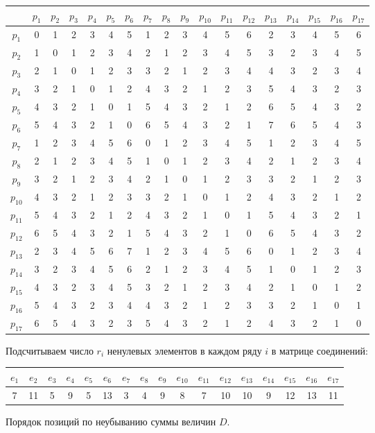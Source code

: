 \documentclass[12pt, a4paper] {ncc}
\begin{document}
\begin{tabular}{c|c|c|c|c|c|c|c|c|c|c|c|c|c|c|c|c|c}
\hline
      & $p_{1}$ & $p_{2}$ & $p_{3}$ & $p_{4}$ & $p_{5}$ & $p_{6}$ & $p_{7}$ & $p_{8}$ & $p_{9}$ & $p_{10}$ & $p_{11}$ & $p_{12}$ & $p_{13}$ & $p_{14}$ & $p_{15}$ & $p_{16}$ & $p_{17}$ \\
\hline
$p_{1}$  & 0 & 1 & 2 & 3 & 4 & 5 & 1 & 2 & 3 & 4 & 5 & 6 & 2 & 3 & 4 & 5 & 6 \\ \hline
$p_{2}$  & 1 & 0 & 1 & 2 & 3 & 4 & 2 & 1 & 2 & 3 & 4 & 5 & 3 & 2 & 3 & 4 & 5 \\ \hline
$p_{3}$  & 2 & 1 & 0 & 1 & 2 & 3 & 3 & 2 & 1 & 2 & 3 & 4 & 4 & 3 & 2 & 3 & 4 \\ \hline
$p_{4}$  & 3 & 2 & 1 & 0 & 1 & 2 & 4 & 3 & 2 & 1 & 2 & 3 & 5 & 4 & 3 & 2 & 3 \\ \hline
$p_{5}$  & 4 & 3 & 2 & 1 & 0 & 1 & 5 & 4 & 3 & 2 & 1 & 2 & 6 & 5 & 4 & 3 & 2 \\ \hline
$p_{6}$  & 5 & 4 & 3 & 2 & 1 & 0 & 6 & 5 & 4 & 3 & 2 & 1 & 7 & 6 & 5 & 4 & 3 \\ \hline
$p_{7}$  & 1 & 2 & 3 & 4 & 5 & 6 & 0 & 1 & 2 & 3 & 4 & 5 & 1 & 2 & 3 & 4 & 5 \\ \hline
$p_{8}$  & 2 & 1 & 2 & 3 & 4 & 5 & 1 & 0 & 1 & 2 & 3 & 4 & 2 & 1 & 2 & 3 & 4 \\ \hline
$p_{9}$  & 3 & 2 & 1 & 2 & 3 & 4 & 2 & 1 & 0 & 1 & 2 & 3 & 3 & 2 & 1 & 2 & 3 \\ \hline
$p_{10}$ & 4 & 3 & 2 & 1 & 2 & 3 & 3 & 2 & 1 & 0 & 1 & 2 & 4 & 3 & 2 & 1 & 2 \\ \hline
$p_{11}$ & 5 & 4 & 3 & 2 & 1 & 2 & 4 & 3 & 2 & 1 & 0 & 1 & 5 & 4 & 3 & 2 & 1 \\ \hline
$p_{12}$ & 6 & 5 & 4 & 3 & 2 & 1 & 5 & 4 & 3 & 2 & 1 & 0 & 6 & 5 & 4 & 3 & 2 \\ \hline
$p_{13}$ & 2 & 3 & 4 & 5 & 6 & 7 & 1 & 2 & 3 & 4 & 5 & 6 & 0 & 1 & 2 & 3 & 4 \\ \hline
$p_{14}$ & 3 & 2 & 3 & 4 & 5 & 6 & 2 & 1 & 2 & 3 & 4 & 5 & 1 & 0 & 1 & 2 & 3 \\ \hline
$p_{15}$ & 4 & 3 & 2 & 3 & 4 & 5 & 3 & 2 & 1 & 2 & 3 & 4 & 2 & 1 & 0 & 1 & 2 \\ \hline
$p_{16}$ & 5 & 4 & 3 & 2 & 3 & 4 & 4 & 3 & 2 & 1 & 2 & 3 & 3 & 2 & 1 & 0 & 1 \\ \hline
$p_{17}$ & 6 & 5 & 4 & 3 & 2 & 3 & 5 & 4 & 3 & 2 & 1 & 2 & 4 & 3 & 2 & 1 & 0 \\ \hline
\end{tabular}


Подсчитываем число $r_i$ ненулевых элементов в каждом ряду $i$ в матрице
соединений:
\begin{longtable}{|c c c c c c c c c c c c c c c c c|}
\hline
$e_{1}$ & $e_{2}$ & $e_{3}$ & $e_{4}$ & $e_{5}$ & $e_{6}$ & $e_{7}$ & $e_{8}$ & $e_{9}$ & $e_{10}$& $e_{11}$& $e_{12}$& $e_{13}$& $e_{14}$& $e_{15}$& $e_{16}$& $e_{17}$ \\
\hline
7 & 11 & 5 & 9 & 5 & 13 & 3 & 4 & 9 & 8 & 7 & 10 & 10 & 9 & 12 & 13 & 11 \\
\hline
\end{longtable}
Порядок позиций по неубыванию суммы величин $D$. 
\end{document}
